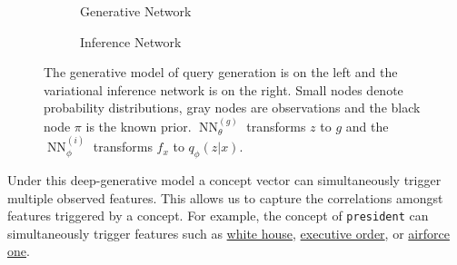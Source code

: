 \documentclass[a4paper]{article}
\newcommand{\cQ}{\mathcal{Q}}
\newcommand{\rQ}{\mathrm{Q}}
\DeclareMathOperator{\NN}{NN}
\newcommand{\gennn}{\NN^{(g)}_\theta}
\newcommand{\infnn}{\NN^{(i)}_\phi}
\newcommand{\cfont}[1]{{\tt #1}}
\newcommand{\ffont}[1]{\underline{#1}}
\begin{document}
\begin{figure}[t]
    \begin{subfigure}[t]{0.4\linewidth}
      \caption{Generative Network}
    \end{subfigure}\hspace{0.1\linewidth}
    \begin{subfigure}[t]{0.49\linewidth}
      \caption{Inference Network}
    \end{subfigure}
    \caption{The generative model of query generation is on the left
      and the variational inference network is on the right.
    Small nodes denote probability distributions,
    gray nodes are observations and the black node $\pi$ is the known prior.
    $\gennn$ transforms $z$ to $g$
    and the $\infnn$ transforms $f_x$ to $q_\phi(z|x)$.}
  \label{fig:q}
\end{figure}

Under this deep-generative model a concept vector can simultaneously trigger multiple observed features. This allows us to capture the correlations amongst features
triggered by a concept. For example, the concept of \cfont{president}
can simultaneously trigger features such as \ffont{white house}, \ffont{executive order}, or \ffont{airforce one}.
\end{document}
